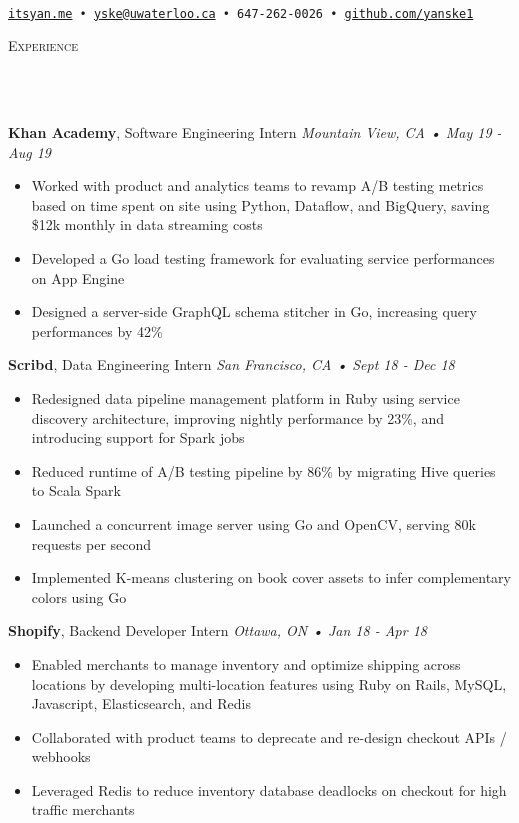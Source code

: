 \documentclass[a4paper, 11pt, hidelinks]{article}
\newcommand{\lineunder} {
    \vspace*{-8pt} \\
    \hrulefill \\
}
\newcommand{\header} [1] {
    \color{bigtext}
    {\hspace*{-4pt}\vspace*{6pt} \textsc{#1}}
    \vspace*{-6pt}
    \color{bodytext}
    \lineunder
    \vspace{6pt}
}
\newcommand{\jobheader} [4] {
    \color{bigtext}\textbf{#1}, #2 \color{weaktext}\hfill\textit{#3 • #4}\\
    \vspace{-1mm} \color{bodytext}
}
\begin{document}
\vspace*{-35pt}
\begin{center}
	\text{\fontsize{35}{40} \selectfont \color{bigtext}{Yan Ke}}\\
    \vspace{10pt}
    \color{weaktext}
    \texttt{\href{http://www.itsyan.me}{itsyan.me} •
    \href{mailto:yske@uwaterloo.ca}{yske@uwaterloo.ca} •
    647-262-0026 •
    \href{http://www.github.com/yanske1}{github.com/yanske1}}
\end{center}
\vspace{-2pt}

\header{Experience}
\jobheader{Khan Academy}{Software Engineering Intern}{Mountain View, CA}{May 19 - Aug 19}
\begin{itemize}[leftmargin=2em] \itemsep 1pt 
    \item Worked with product and analytics teams to revamp A/B testing metrics based on time spent on site
    using Python, Dataflow, and BigQuery, saving \$12k monthly in data streaming costs
    \item Developed a Go load testing framework for evaluating service performances on App Engine
    \item Designed a server-side GraphQL schema stitcher in Go, increasing query performances by 42\%
\end{itemize}

\jobheader{Scribd}{Data Engineering Intern}{San Francisco, CA}{Sept 18 - Dec 18}
\begin{itemize}[leftmargin=2em] \itemsep 1pt \color{bodytext}
	\item Redesigned data pipeline management platform in Ruby using service discovery architecture,
    improving nightly performance by 23\%, and introducing support for Spark jobs
	\item Reduced runtime of A/B testing pipeline by 86\% by migrating Hive queries to Scala Spark
	\item Launched a concurrent image server using Go and OpenCV, serving 80k requests per second
	\item Implemented K-means clustering on book cover assets to infer complementary colors using Go
\end{itemize}

\jobheader{Shopify}{Backend Developer Intern}{Ottawa, ON}{Jan 18 - Apr 18}
\begin{itemize}[leftmargin=2em] \itemsep 1pt \color{bodytext}
	\item Enabled merchants to manage inventory and optimize shipping across locations by developing
    multi-location features using Ruby on Rails, MySQL, Javascript, Elasticsearch, and Redis
	\item Collaborated with product teams to deprecate and re-design checkout APIs / webhooks
	\item Leveraged Redis to reduce inventory database deadlocks on checkout for high traffic merchants
\end{itemize}
\end{document}
